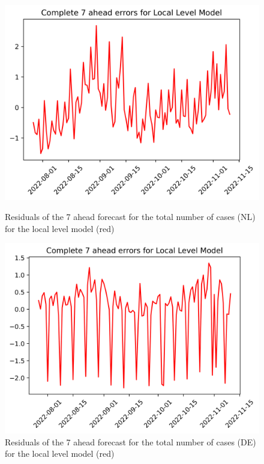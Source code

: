 
\begin{figure}

\begin{minipage}{.32\textwidth}
  \centering
  \includegraphics[width=\linewidth]{pics/7_ah/7_ahead_errors_Local Level Model.png}
  \caption{Residuals of the 7 ahead forecast for the total number of cases (NL) for the local level model (red)}
  \label{fig:tot_cases_error_7_LLM}
\end{minipage}
\begin{minipage}{.32\textwidth}
  \centering
  \includegraphics[width=\linewidth]{pics/7_ah/DE_7_ahead_errors_Local Level Model.png}
  \caption{Residuals of the 7 ahead forecast for the total number of cases (DE) for the local level model (red)}

\end{minipage}
\end{figure}
